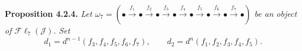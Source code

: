 \medskip\noindent\textbf{Proposition 4.2.4.}\quad
\textit{Let
$\omega_7=(\mathord\bullet\xrightarrow{f_1}\mathord\bullet
\xrightarrow{f_2}\mathord\bullet\xrightarrow{f_3}\mathord\bullet
\xrightarrow{f_4}\mathord\bullet\xrightarrow{f_5}\mathord\bullet
\xrightarrow{f_6}\mathord\bullet\xrightarrow{f_7}\mathord\bullet)$
be an object of $\mathcal{F}\ell_7(\mathcal J)$. Set}
\[
d_1=d^{n-1}(f_3,f_4,f_5,f_6,f_7),
\qquad
d_2=d^n(f_1,f_2,f_3,f_4,f_5).
\]
\endgroup

